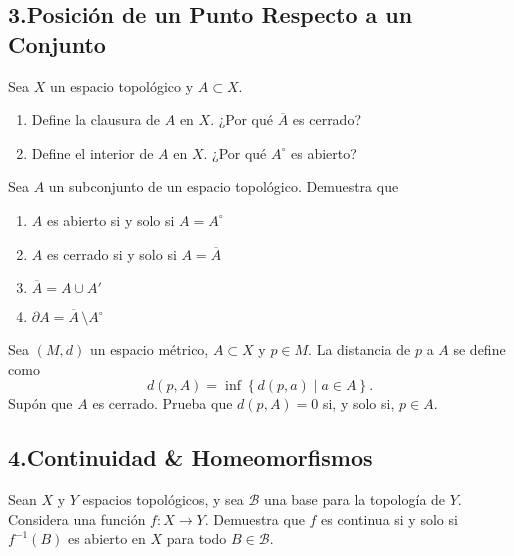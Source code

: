 \documentclass[b5paper,10pt,twoside]{book}
\begin{document}
\subsection*{3.\enspace Posición de un Punto Respecto  a un Conjunto}


\begin{problem}
Sea \(X\) un espacio topológico y \(A\subset X\).
\begin{enumerate}[label=(\roman*)]
\item Define la clausura de \(A\) en \(X\). ¿Por qué \(\overline{A}\) es cerrado?
\item Define el interior  de \(A\) en \(X\).  ¿Por qué \({A}^\circ \) es abierto?
\end{enumerate}
\end{problem}

\begin{problem}
Sea \(A\) un subconjunto de un espacio topológico.
Demuestra que 
\begin{enumerate}[label=(\roman*)]
\item \(A\) es abierto si y solo si \(A = A^\circ\)
\item \(A\) es cerrado si y solo si \(A = \overline{A}\)
\item \(\overline{A} = A \cup A'\)
\item \(\partial A = \overline{A}\,\setminus A^\circ \)
\end{enumerate}
\end{problem}

\begin{problem}
Sea \((M,d)\) un espacio métrico,
\(A\subset X\) y \(p\in M\).
La distancia de \(p\) a \(A\)
se define como 
\[
d(p,A) = \inf\left\{ d(p,a)\mid a\in A \right\}.
\]
Supón que \(A\) es cerrado.
Prueba que \(d(p,A) = 0\) si, y solo si, \(p\in A\).
\end{problem}


\subsection*{4.\enspace Continuidad \& Homeomorfismos}


\begin{problem}
Sean \(X\) y \(Y\) espacios topológicos, y 
sea \(\mathcal{B}\)  una base para la topología de \(Y\).
Considera una función \(f\colon X\to Y\).
Demuestra que \(f\)
es continua si y solo si \(f^{-1}(B)\) es abierto en \(X\) para todo \(B\in \mathcal{B}\).
\end{problem}
\end{document}
